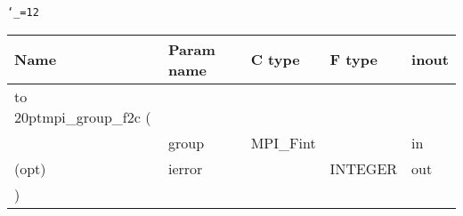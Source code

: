 \begingroup\tt\catcode`\_=12
\begin{tabular}{lllll}
\toprule
\textrm{Name}&\textrm{Param name}&\textrm{C type}&\textrm{F type}&\textrm{inout}\\
\midrule
\hbox to 20pt{mpi_group_f2c (\hss} \\
&group&MPI_Fint&&in\\
(opt)&ierror&&INTEGER&out\\
)\\
\bottomrule
\end{tabular}
\endgroup

